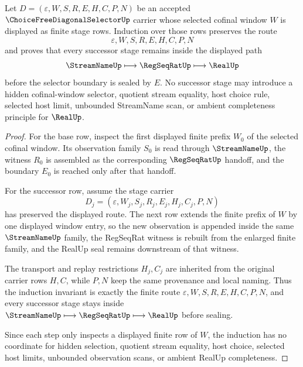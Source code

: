 \begin{theorem}
\label{thm:choice-free-diagonal-selector-stage-induction}
Let $D=(\varepsilon,W,S,R,E,H,C,P,N)$ be an accepted $\ChoiceFreeDiagonalSelectorUp$ carrier whose selected cofinal window $W$ is displayed as finite stage rows. Induction over those rows preserves the route
$$
\varepsilon,W,S,R,E,H,C,P,N
$$
and proves that every successor stage remains inside the displayed path
$$
\StreamNameUp\longmapsto \RegSeqRatUp\longmapsto \RealUp
$$
before the selector boundary is sealed by $E$. No successor stage may introduce a hidden cofinal-window selector, quotient stream equality, host choice rule, selected host limit, unbounded StreamName scan, or ambient completeness principle for $\RealUp$.
\end{theorem}
\begin{proof}
For the base row, inspect the first displayed finite prefix $W_0$ of the selected cofinal window. Its observation family $S_0$ is read through $\StreamNameUp$, the witness $R_0$ is assembled as the corresponding $\RegSeqRatUp$ handoff, and the boundary $E_0$ is reached only after that handoff.

For the successor row, assume the stage carrier
$$
D_j=(\varepsilon,W_j,S_j,R_j,E_j,H_j,C_j,P,N)
$$
has preserved the displayed route. The next row extends the finite prefix of $W$ by one displayed window entry, so the new observation is appended inside the same $\StreamNameUp$ family, the RegSeqRat witness is rebuilt from the enlarged finite family, and the RealUp seal remains downstream of that witness.

The transport and replay restrictions $H_j,C_j$ are inherited from the original carrier rows $H,C$, while $P,N$ keep the same provenance and local naming. Thus the induction invariant is exactly the finite route $\varepsilon,W,S,R,E,H,C,P,N$, and every successor stage stays inside $\StreamNameUp\longmapsto \RegSeqRatUp\longmapsto \RealUp$ before sealing.

Since each step only inspects a displayed finite row of $W$, the induction has no coordinate for hidden selection, quotient stream equality, host choice, selected host limits, unbounded observation scans, or ambient RealUp completeness.
\end{proof}

